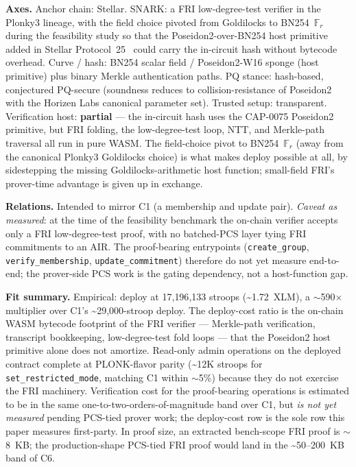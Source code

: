 \textbf{Axes.} Anchor chain: Stellar. SNARK: a FRI low-degree-test
verifier in the Plonky3 lineage, with the field choice pivoted from
Goldilocks to BN254~$\mathbb{F}_r$ during the feasibility study so
that the Poseidon2-over-BN254 host primitive added in Stellar
Protocol~25~\cite{stellar-cap-0075} could carry the in-circuit hash
without bytecode overhead. Curve / hash: BN254 scalar field /
Poseidon2-W16 sponge (host primitive) plus binary Merkle
authentication paths. PQ stance: hash-based, conjectured PQ-secure
(soundness reduces to collision-resistance of Poseidon2 with the
Horizen Labs canonical parameter set). Trusted setup: transparent.
Verification host: \textbf{partial} --- the in-circuit hash uses the
CAP-0075 Poseidon2 primitive, but FRI folding, the low-degree-test
loop, NTT, and Merkle-path traversal all run in pure WASM. The
field-choice pivot to BN254~$\mathbb{F}_r$ (away from the canonical
Plonky3 Goldilocks choice) is what makes deploy possible at all, by
sidestepping the missing Goldilocks-arithmetic host function;
small-field FRI's prover-time advantage is given up in exchange.

\textbf{Relations.} Intended to mirror C1 (a membership and update
pair). \emph{Caveat as measured}: at the time of the feasibility
benchmark the on-chain verifier accepts only a FRI low-degree-test
proof, with no batched-PCS layer tying FRI commitments to an AIR.
The proof-bearing entrypoints (\texttt{create\_group},
\texttt{verify\_membership}, \texttt{update\_commitment}) therefore
do not yet measure end-to-end; the prover-side PCS work is the
gating dependency, not a host-function gap.

\textbf{Fit summary.} Empirical: deploy at 17{,}196{,}133 stroops
(\textasciitilde 1.72~XLM), a $\sim$590$\times$ multiplier over C1's
\textasciitilde 29{,}000-stroop deploy. The deploy-cost ratio is the
on-chain WASM bytecode footprint of the FRI verifier --- Merkle-path
verification, transcript bookkeeping, low-degree-test fold loops ---
that the Poseidon2 host primitive alone does not amortize. Read-only
admin operations on the deployed contract complete at PLONK-flavor
parity (\textasciitilde 12K stroops for \texttt{set\_restricted\_mode},
matching C1 within $\sim$5\%) because they do not exercise the FRI
machinery. Verification cost for the proof-bearing operations is
estimated to be in the same one-to-two-orders-of-magnitude band over
C1, but \emph{is not yet measured} pending PCS-tied prover work; the
deploy-cost row is the sole row this paper measures first-party. In
proof size, an extracted bench-scope FRI proof is $\sim$8~KB; the
production-shape PCS-tied FRI proof would land in the
\textasciitilde 50--200~KB band of C6.

